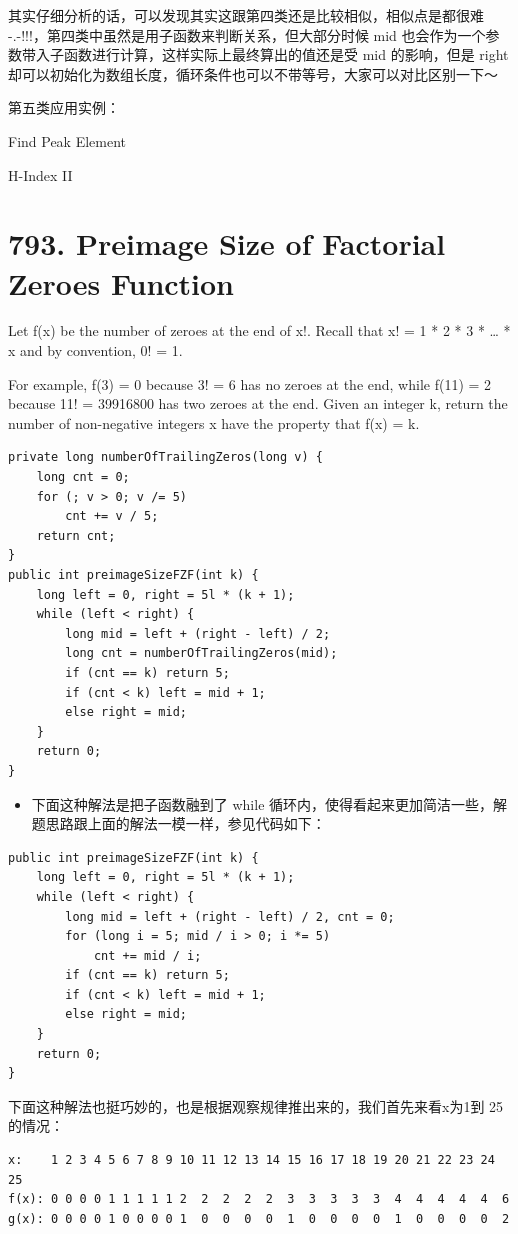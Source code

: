 \documentclass[9pt, b5paaper]{book}
\begin{document}
其实仔细分析的话，可以发现其实这跟第四类还是比较相似，相似点是都很难 -.-!!!，第四类中虽然是用子函数来判断关系，但大部分时候 mid 也会作为一个参数带入子函数进行计算，这样实际上最终算出的值还是受 mid 的影响，但是 right 却可以初始化为数组长度，循环条件也可以不带等号，大家可以对比区别一下～

第五类应用实例：

Find Peak Element

H-Index II

\section{793. Preimage Size of Factorial Zeroes Function}
\label{sec-5-2}
Let f(x) be the number of zeroes at the end of x!. Recall that x! = 1 * 2 * 3 * \ldots{} * x and by convention, 0! = 1.

For example, f(3) = 0 because 3! = 6 has no zeroes at the end, while f(11) = 2 because 11! = 39916800 has two zeroes at the end.
Given an integer k, return the number of non-negative integers x have the property that f(x) = k.

\begin{verbatim}
private long numberOfTrailingZeros(long v) {
    long cnt = 0;
    for (; v > 0; v /= 5) 
        cnt += v / 5;
    return cnt;
}
public int preimageSizeFZF(int k) {
    long left = 0, right = 5l * (k + 1);
    while (left < right) {
        long mid = left + (right - left) / 2;
        long cnt = numberOfTrailingZeros(mid);
        if (cnt == k) return 5;
        if (cnt < k) left = mid + 1;
        else right = mid;
    }
    return 0;
}
\end{verbatim}
\begin{itemize}
\item 下面这种解法是把子函数融到了 while 循环内，使得看起来更加简洁一些，解题思路跟上面的解法一模一样，参见代码如下：
\end{itemize}
\begin{verbatim}
public int preimageSizeFZF(int k) {
    long left = 0, right = 5l * (k + 1);
    while (left < right) {
        long mid = left + (right - left) / 2, cnt = 0;
        for (long i = 5; mid / i > 0; i *= 5) 
            cnt += mid / i;
        if (cnt == k) return 5;
        if (cnt < k) left = mid + 1;
        else right = mid;
    }
    return 0;
}
\end{verbatim}

下面这种解法也挺巧妙的，也是根据观察规律推出来的，我们首先来看x为1到 25 的情况：
\begin{verbatim}
x:    1 2 3 4 5 6 7 8 9 10 11 12 13 14 15 16 17 18 19 20 21 22 23 24 25
f(x): 0 0 0 0 1 1 1 1 1 2  2  2  2  2  3  3  3  3  3  4  4  4  4  4  6
g(x): 0 0 0 0 1 0 0 0 0 1  0  0  0  0  1  0  0  0  0  1  0  0  0  0  2
\end{verbatim}
\end{document}
